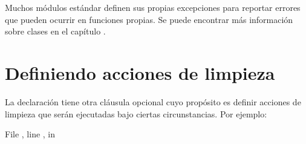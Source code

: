 \documentclass[a4,10pt,spanish]{sphinxmanual}
\begin{document}
\sphinxAtStartPar
Muchos módulos estándar definen sus propias excepciones para reportar errores que pueden ocurrir en funciones propias. Se puede encontrar más información sobre clases en el capítulo {\hyperref[\detokenize{tutorial/classes:tut-classes}]{}}.


\section{Definiendo acciones de limpieza}
\label{\detokenize{tutorial/errors:defining-clean-up-actions}}\label{\detokenize{tutorial/errors:tut-cleanup}}
\sphinxAtStartPar
La declaración  tiene otra cláusula opcional cuyo propósito es definir acciones de limpieza que serán ejecutadas bajo ciertas circunstancias. Por ejemplo:

\begin{sphinxVerbatim}[commandchars=\\\{\}]
     
    
  File , line , in 
\end{sphinxVerbatim}
\end{document}
